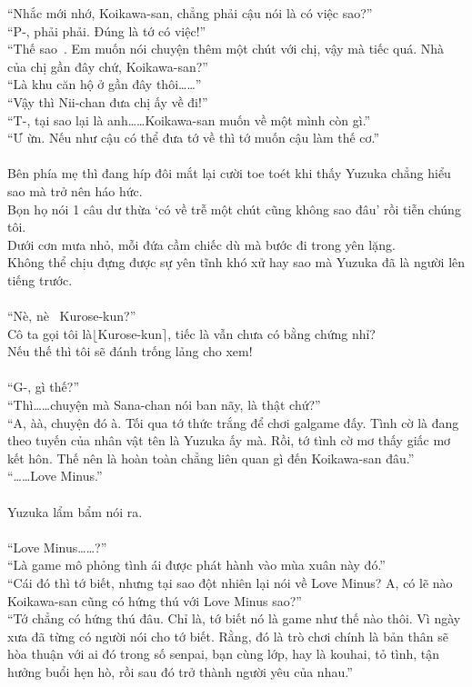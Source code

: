 \documentclass[12pt,a4paper, twosides]{book}
\begin{document}
“Nhắc mới nhớ, Koikawa-san, chẳng phải cậu nói là có việc sao?”\\
“P-, phải phải. Đúng là tớ có việc!”\\
“Thế sao~. Em muốn nói chuyện thêm một chút với chị, vậy mà tiếc quá. Nhà của chị gần đây chứ, Koikawa-san?”\\
“Là khu căn hộ ở gần đây thôi……”\\
“Vậy thì Nii-chan đưa chị ấy về đi!”\\
“T-, tại sao lại là anh……Koikawa-san muốn về một mình còn gì.”\\
“Ư ừn. Nếu như cậu có thể đưa tớ về thì tớ muốn cậu làm thế cơ.”\\
\\
Bên phía mẹ thì đang híp đôi mắt lại cười toe toét khi thấy Yuzuka chẳng hiểu sao mà trở nên háo hức.\\
Bọn họ nói 1 câu dư thừa ‘có về trễ một chút cũng không sao đâu’ rồi tiễn chúng tôi.\\
Dưới cơn mưa nhỏ, mỗi đứa cầm chiếc dù mà bước đi trong yên lặng.\\
Không thể chịu đựng được sự yên tĩnh khó xử hay sao mà Yuzuka đã là người lên tiếng trước.\\
\\
“Nè, nè~ Kurose-kun?”\\
Cô ta gọi tôi là$\lfloor$Kurose-kun$\rceil$, tiếc là vẫn chưa có bằng chứng nhỉ?\\
Nếu thế thì tôi sẽ đánh trống lảng cho xem!\\
\\
“G-, gì thế?”\\
“Thì……chuyện mà Sana-chan nói ban nãy, là thật chứ?”\\
“A, àà, chuyện đó à. Tối qua tớ thức trắng để chơi galgame đấy. Tình cờ là đang theo tuyến của nhân vật tên là Yuzuka ấy mà. Rồi, tớ tình cờ mơ thấy giấc mơ kết hôn. Thế nên là hoàn toàn chẳng liên quan gì đến Koikawa-san đâu.”\\
“……Love Minus.”\\
\\
Yuzuka lẩm bẩm nói ra.\\
\\
“Love Minus……?”\\
“Là game mô phỏng tình ái được phát hành vào mùa xuân này đó.”\\
“Cái đó thì tớ biết, nhưng tại sao đột nhiên lại nói về Love Minus? A, có lẽ nào Koikawa-san cũng có hứng thú với Love Minus sao?”\\
“Tớ chẳng có hứng thú đâu. Chỉ là, tớ biết nó là game như thế nào thôi. Vì ngày xưa đã từng có người nói cho tớ biết. Rằng, đó là trò chơi chính là bản thân sẽ hòa thuận với ai đó trong số senpai, bạn cùng lớp, hay là kouhai, tỏ tình, tận hưởng buổi hẹn hò, rồi sau đó trở thành người yêu của nhau.”\\
\end{document}
